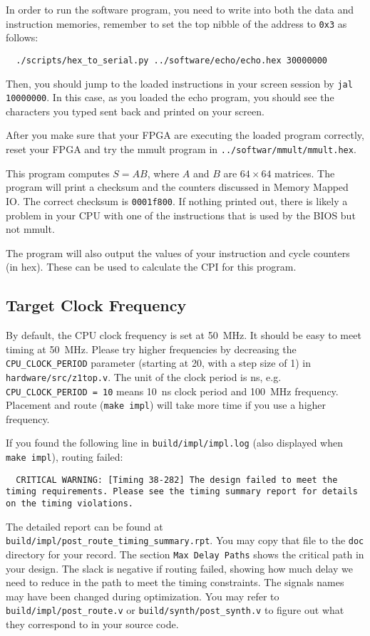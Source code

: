 In order to run the software program,
you need to write into both the data and instruction memories,
remember to set the top nibble of the address to \verb|0x3| as follows:
\begin{verbatim}
  ./scripts/hex_to_serial.py ../software/echo/echo.hex 30000000
\end{verbatim}
Then, you should jump to the loaded instructions in your screen session by \verb|jal 10000000|.
In this case, as you loaded the echo program, you should see the characters you typed
sent back and printed on your screen.

After you make sure that your FPGA are executing the loaded program correctly,
reset your FPGA and try the mmult program in \verb|../softwar/mmult/mmult.hex|.

This program computes $S=AB$, where $A$ and $B$ are $64 \times 64$ matrices.
The program will print a checksum and the counters discussed in Memory Mapped IO.
The correct checksum is \verb|0001f800|.
If nothing printed out, there is likely a problem in your CPU with one of the instructions that is used by the BIOS but not mmult.

The program will also output the values of your instruction and cycle counters (in hex).
These can be used to calculate the CPI for this program.

\subsection{Target Clock Frequency}
By default, the CPU clock frequency is set at 50~MHz.
It should be easy to meet timing at 50~MHz.
Please try higher frequencies by decreasing the \verb|CPU_CLOCK_PERIOD| parameter
(starting at 20, with a step size of 1) in \verb|hardware/src/z1top.v|.
The unit of the clock period is ns,
e.g. \verb|CPU_CLOCK_PERIOD = 10| means 10~ns clock period and 100~MHz frequency.
Placement and route (\verb|make impl|) will take more time if you use a higher frequency.

If you found the following line in \verb|build/impl/impl.log|
(also displayed when \verb|make impl|), routing failed:
\begin{verbatim}
  CRITICAL WARNING: [Timing 38-282] The design failed to meet the timing requirements. Please see the timing summary report for details on the timing violations.
\end{verbatim}
The detailed report can be found at \verb|build/impl/post_route_timing_summary.rpt|.
You may copy that file to the \verb|doc| directory for your record.
The section \verb|Max Delay Paths| shows the critical path in your design.
The slack is negative if routing failed, showing how much delay we need to reduce in the path
to meet the timing constraints.
The signals names may have been changed during optimization.
You may refer to \verb|build/impl/post_route.v| or \verb|build/synth/post_synth.v|
to figure out what they correspond to in your source code.


\newpage
